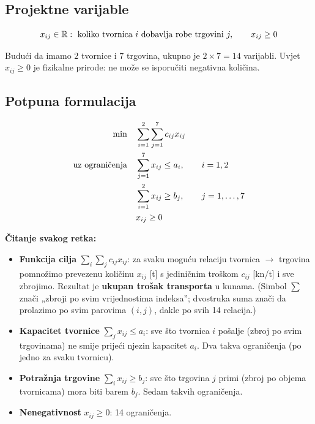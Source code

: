 \subsection{Projektne varijable}

\[
x_{ij} \in \R: \text{ koliko tvornica } i \text{ dobavlja robe trgovini } j,
\qquad x_{ij} \ge 0
\]

Budući da imamo $2$ tvornice i $7$ trgovina, ukupno je $2 \times 7 = 14$
varijabli. Uvjet $x_{ij} \ge 0$ je fizikalne prirode: ne može se isporučiti
negativna količina.

\subsection{Potpuna formulacija}

\begin{equation}
\begin{aligned}
\min \quad & \sum_{i=1}^{2} \sum_{j=1}^{7} c_{ij} x_{ij} \\
\uzogr & \sum_{j=1}^{7} x_{ij} \le a_i, \qquad i = 1, 2 \\
       & \sum_{i=1}^{2} x_{ij} \ge b_j, \qquad j = 1, \dots, 7 \\
       & x_{ij} \ge 0
\end{aligned}
\end{equation}

\textbf{Čitanje svakog retka:}

\begin{itemize}
  \item \textbf{Funkcija cilja} $\sum_i \sum_j c_{ij} x_{ij}$: za svaku moguću
        relaciju tvornica $\to$ trgovina pomnožimo prevezenu količinu $x_{ij}$
        [t] s jediničnim troškom $c_{ij}$ [kn/t] i sve zbrojimo. Rezultat je
        \textbf{ukupan trošak transporta} u kunama. (Simbol $\sum$ znači
        „zbroji po svim vrijednostima indeksa”; dvostruka suma znači da
        prolazimo po svim parovima $(i,j)$, dakle po svih 14 relacija.)
  \item \textbf{Kapacitet tvornice} $\sum_{j} x_{ij} \le a_i$: sve što tvornica
        $i$ pošalje (zbroj po svim trgovinama) ne smije prijeći njezin kapacitet
        $a_i$. Dva takva ograničenja (po jedno za svaku tvornicu).
  \item \textbf{Potražnja trgovine} $\sum_{i} x_{ij} \ge b_j$: sve što trgovina
        $j$ primi (zbroj po objema tvornicama) mora biti barem $b_j$. Sedam
        takvih ograničenja.
  \item \textbf{Nenegativnost} $x_{ij} \ge 0$: 14 ograničenja.
\end{itemize}

